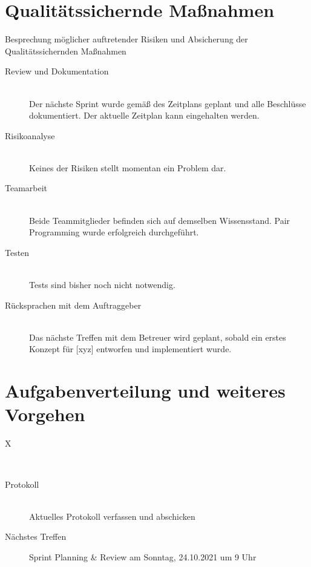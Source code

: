 \section{Qualitätssichernde Maßnahmen}
Besprechung möglicher auftretender Risiken und Absicherung der Qualitätssichernden Maßnahmen
\begin{description}
	\item[Review und Dokumentation] \hfill \fullcheck\\
	Der nächste Sprint wurde gemäß des Zeitplans geplant und alle Beschlüsse dokumentiert. Der aktuelle Zeitplan kann eingehalten werden.
	\item[Risikoanalyse] \hfill \fullcheck \\ 
	Keines der Risiken stellt momentan ein Problem dar.
	\item[Teamarbeit] \hfill \fullcheck \\ 
	Beide Teammitglieder befinden sich auf demselben Wissensstand. Pair Programming wurde erfolgreich durchgeführt.
	\item[Testen] \hfill \fullcheck \\ 
	Tests sind bisher noch nicht notwendig.
	\item[Rücksprachen mit dem Auftraggeber] \hfill \fullcheck \\ 
	Das nächste Treffen mit dem Betreuer wird geplant, sobald ein erstes Konzept für [xyz] entworfen und implementiert wurde.
	
\end{description}

\section{Aufgabenverteilung und weiteres Vorgehen}
\begin{description}
	\item[X] \hfill {}\\
	
	\item[Protokoll] \hfill {}\\Aktuelles Protokoll verfassen und abschicken 
	\item[Nächstes Treffen] Sprint Planning \& Review am Sonntag, 24.10.2021 um 9 Uhr 
\end{description}

